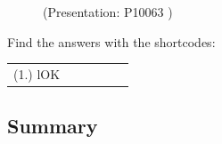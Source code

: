 	\begin{figure}[H] %
    
    \label{m38727*slidesharemedia}\label{m38727*slideshareflash} { (Presentation:  P10063 )}
      
      \vspace{2pt}
    \vspace{.1in}
    
    

 \end{figure}   

    \addtocounter{footnote}{-0}
    \par \label{m38727*cid6}
\par {} Find the answers with the shortcodes:
 \par \begin{tabular}[h]{cccccc}
 (1.) lOK  & \end{tabular}



            \subsection{ Summary}
            \nopagebreak
            
